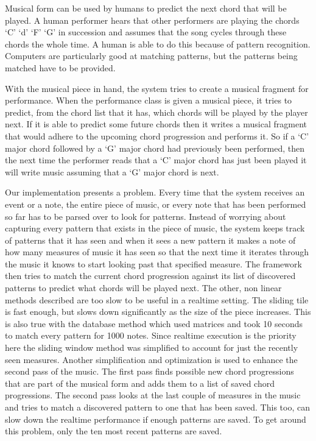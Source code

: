 \documentclass[12pt]{ucthesis}
\begin{document}
Musical form can be used by humans to predict the next chord that will be played. A human performer hears that other performers are playing the chords `C' `d' `F' `G' in succession and assumes that the song cycles through these chords the whole time. A human is able to do this because of pattern recognition. Computers are particularly good at matching patterns, but the patterns being matched have to be provided.

With the musical piece in hand, the system tries to create a musical fragment for performance. When the performance class is given a musical piece, it tries to predict, from the chord list that it has, which chords will be played by the player next. If it is able to predict some future chords then it writes a musical fragment that would adhere to the upcoming chord progression and performs it. So if a `C' major chord followed by a `G' major chord had previously been performed, then the next time the performer reads that a `C' major chord has just been played it will write music assuming that a `G' major chord is next. 

Our implementation presents a problem. Every time that the system receives an event or a note, the entire piece of music, or every note that has been performed so far has to be parsed over to look for patterns. Instead of worrying about capturing every pattern that exists in the piece of music, the system keeps track of patterns that it has seen and when it sees a new pattern it makes a note of how many measures of music it has seen so that the next time it iterates through the music it knows to start looking past that specified measure. The framework then tries to match the current chord progression against its list of discovered patterns to predict what chords will be played next. The other, non linear methods described are too slow to be useful in a realtime setting. The sliding tile is fast enough, but slows down significantly as the size of the piece increases. This is also true with the database method which used matrices and took 10 seconds to match every pattern for 1000 notes. Since realtime execution is the priority here the sliding window method was simplified to account for just the recently seen measures. Another simplification and optimization is used to enhance the second pass of the music. The first pass finds possible new chord progressions that are part of the musical form and adds them to a list of saved chord progressions. The second pass looks at the last couple of measures in the music and tries to match a discovered pattern to one that has been saved. This too, can slow down the realtime performance if enough patterns are saved. To get around this problem, only the ten most recent patterns are saved. 
\end{document}

